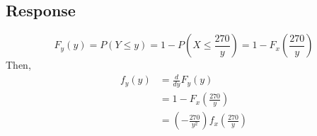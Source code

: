 \documentclass[13pt]{article}
\begin{document}
\subsection*{Response}
\[F_y(y) = P(Y \leq y) = 1 - P\left( X \leq \frac{270}{y} \right) = 1 - F_x\left( \frac{270}{y} \right)\]
Then,
\begin{align*}
  f_y(y) &= \frac{d}{dy} F_y(y) \\
         &= 1 - F_x\left( \frac{270}{y} \right) \\
         &= \left( -\frac{270}{y^2} \right) f_x \left( \frac{270}{y} \right) \\
\end{align*}
\end{document}
